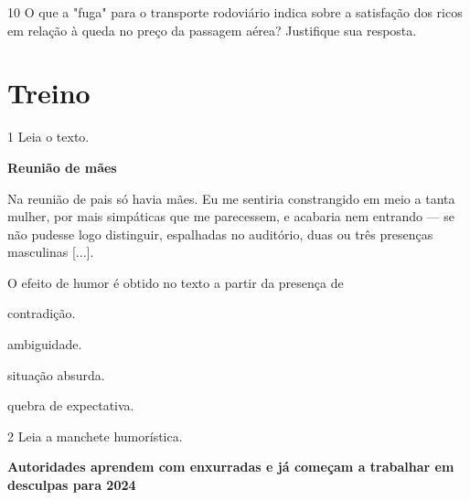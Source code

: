 \num{10} O que a "fuga" para o transporte rodoviário indica sobre a
satisfação dos ricos em relação à queda no preço da passagem aérea?
Justifique sua resposta.


\section*{Treino}

\num{1} Leia o texto.

\begin{myquote}
\centering\textbf{Reunião de mães}
\end{myquote}


\begin{myquote}
Na reunião de pais só havia mães. Eu me sentiria constrangido em meio a
tanta mulher, por mais simpáticas que me parecessem, e acabaria nem
entrando --- se não pudesse logo distinguir, espalhadas no auditório,
duas ou três presenças masculinas {[}...{]}.

\end{myquote}

O efeito de humor é obtido no texto a partir da presença de

\begin{escolha}
\item contradição.

\item ambiguidade.

\item situação absurda.

\item quebra de expectativa.
\end{escolha}

\num{2} Leia a manchete humorística.

\begin{myquote}
\textbf{Autoridades aprendem com enxurradas e já começam a trabalhar em
desculpas para 2024}

\end{myquote}

